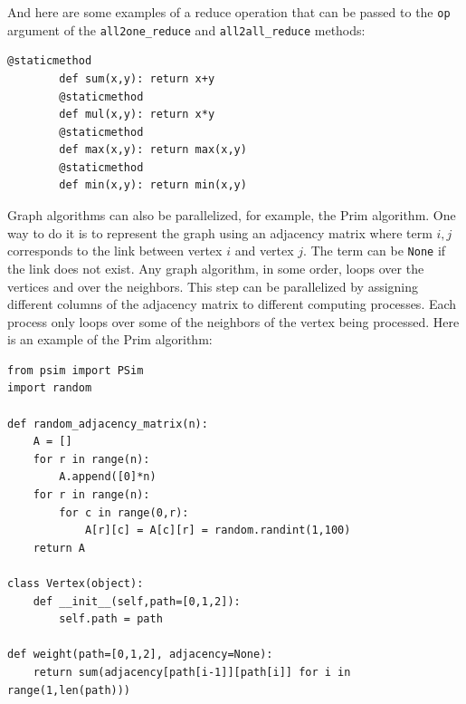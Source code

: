 \documentclass[justified,sixbynine]{tufte-book}
\def\ft{\small\tt}
\theoremstyle{plain}%
\theoremstyle{definition}
\theoremstyle{remark}
\begin{document}
\begin{fullwidth}
And here are some examples of a reduce operation that can be passed to the {\ft op} argument of the {\ft all2one\_reduce} and {\ft all2all\_reduce} methods:

\begin{lstlisting}[caption={in file: {\ft psim.py}}]
        @staticmethod
        def sum(x,y): return x+y
        @staticmethod
        def mul(x,y): return x*y
        @staticmethod
        def max(x,y): return max(x,y)
        @staticmethod
        def min(x,y): return min(x,y)
\end{lstlisting}

Graph algorithms can also be parallelized, for example, the Prim algorithm. One way to do it is to represent the graph using an adjacency matrix where term $i,j$ corresponds to the link between vertex $i$ and vertex $j$. The term can be {\ft None} if the link does not exist. Any graph algorithm, in some order, loops over the vertices and over the neighbors. This step can be parallelized by assigning different columns of the adjacency matrix to different computing processes. Each process only loops over some of the neighbors of the vertex being processed. Here is an example of the Prim algorithm:

\begin{lstlisting}[caption={in file: {\ft psim\_prim.py}}]
from psim import PSim
import random

def random_adjacency_matrix(n):
    A = []
    for r in range(n):
        A.append([0]*n)
    for r in range(n):
        for c in range(0,r):
            A[r][c] = A[c][r] = random.randint(1,100)
    return A

class Vertex(object):
    def __init__(self,path=[0,1,2]):
        self.path = path

def weight(path=[0,1,2], adjacency=None):
    return sum(adjacency[path[i-1]][path[i]] for i in range(1,len(path)))


\end{lstlisting}
\end{fullwidth}
\end{document}
